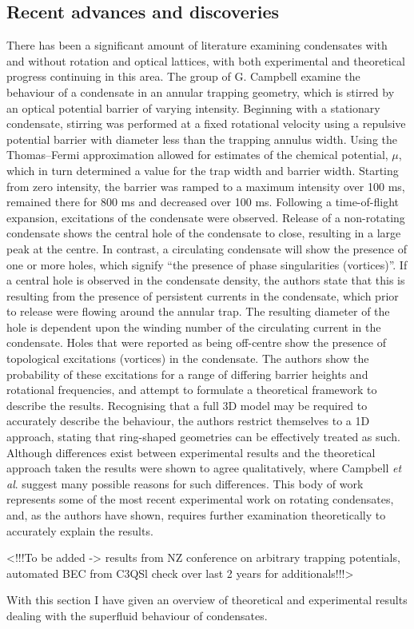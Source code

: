 \subsection{Recent advances and discoveries}
There has been a significant amount of literature examining condensates with and without rotation and optical lattices, with both experimental and theoretical progress continuing in this area. The group of G. Campbell \cite{Vtx:Wright_pra_2013} examine the behaviour of a condensate in an annular trapping geometry, which is stirred by an optical potential barrier of varying intensity. Beginning with a stationary condensate, stirring was performed at a fixed rotational velocity using a repulsive potential barrier with diameter less than the trapping annulus width. Using the Thomas--Fermi approximation allowed for estimates of the chemical potential, $\mu$, which in turn determined a value for the trap width and barrier width. Starting from zero intensity, the barrier was ramped to a maximum intensity over 100 ms, remained there for 800 ms and decreased over 100 ms. Following a time-of-flight expansion, excitations of the condensate were observed. Release of a non-rotating condensate shows the central hole of the condensate to close, resulting in a large peak at the centre. In contrast, a circulating condensate will show the presence of one or more holes, which signify ``the presence of phase singularities (vortices)''. If a central hole is observed in the condensate density, the authors state that this is resulting from the presence of persistent currents in the condensate, which prior to release were flowing around the annular trap. The resulting diameter of the hole is dependent upon the winding number of the circulating current in the condensate. Holes that were reported as being off-centre show the presence of topological excitations (vortices) in the condensate.  The authors show the probability of these excitations for a range of differing barrier heights and rotational frequencies, and attempt to formulate a theoretical framework to describe the results. Recognising that a full 3D model may be required to accurately describe the behaviour, the authors restrict themselves to a 1D approach, stating that ring-shaped geometries can be effectively treated as such. Although differences exist between experimental results and the theoretical approach taken the results were shown to agree qualitatively, where Campbell \textit{et al}. suggest many possible reasons for such differences. This body of work represents some of the most recent experimental work on rotating condensates, and, as the authors have shown, requires further examination theoretically to accurately explain the results.

<!!!To be added -> results from NZ conference on arbitrary trapping potentials, automated BEC from C3QSl check over last 2 years for additionals!!!>

With this section I have given an overview of theoretical and experimental results dealing with the superfluid behaviour of condensates.
